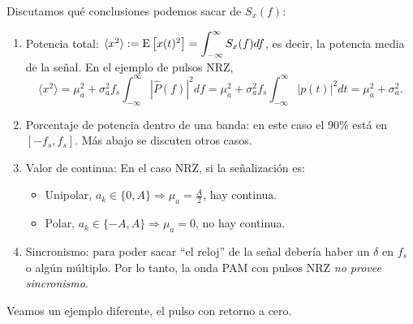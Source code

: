 Discutamos qué conclusiones podemos sacar de $S_x(f)$:
\begin{enumerate}
    \item Potencia total: $\langle x^2\rangle := \mathrm{E}\left[x(t)^2\right] = \displaystyle\int_{-\infty}^{\infty} S_x(f) d f $, es decir, la potencia media de la señal.
    En el ejemplo de pulsos NRZ,
    \begin{equation*}
     \langle x^2\rangle = \mu_a^2 +\sigma_a^2 f_s \displaystyle\int_{-\infty}^{\infty}
    \left|\hat{P}(f)\right|^2 d f = \mu_a^2 +\sigma_a^2 f_s \displaystyle\int_{-\infty}^{\infty} \left|p(t)\right|^2 d
    t = \mu_a^2 + \sigma_a^2.
    \end{equation*}
    \item Porcentaje de potencia dentro de una banda: en este caso el $90\%$ está en $[-f_s,f_s]$. Más abajo se discuten otros casos.
     \item Valor de continua: En el caso NRZ, si la señalización es:
    \begin{itemize}
        \item Unipolar, $a_k\in \{0,A\}\Rightarrow \mu_a=\frac{A}{2}$, hay continua.
        \item Polar, $a_k\in \{-A,A\}\Rightarrow \mu_a = 0$, no hay continua.
    \end{itemize}
    \item Sincronismo: para poder sacar ``el reloj'' de la señal debería haber un $\delta$ en $f_s$ o algún múltiplo. Por lo tanto, la onda PAM con pulsos NRZ \emph{no provee sincronismo}.
\end{enumerate}

Veamos un ejemplo diferente, el pulso con retorno a cero.

